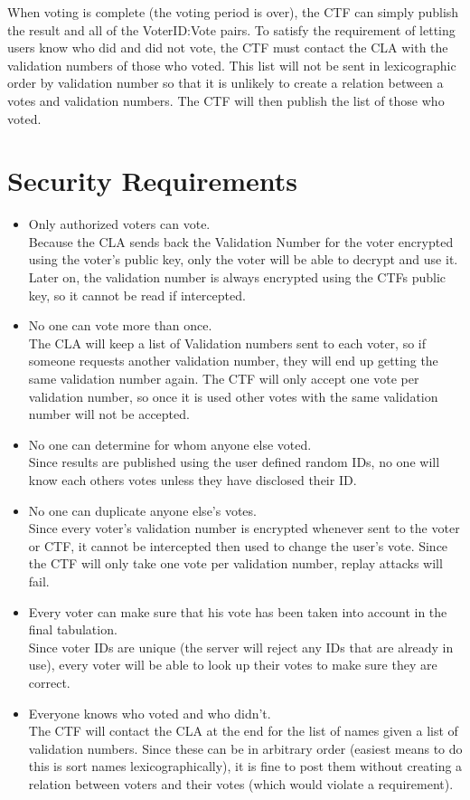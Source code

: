 \documentclass{article} \usepackage[margin=1in]{geometry} \usepackage{amsmath}
\begin{document}
When voting is complete (the voting period is over), the CTF can simply publish the result and all of the VoterID:Vote pairs. To satisfy the requirement of letting users know who did and did not vote, the CTF must contact the CLA with the validation numbers of those who voted. This list will not be sent in lexicographic order by validation number so that it is unlikely to create a relation between a votes and validation numbers. The CTF will then publish the list of those who voted. \\

\section{Security Requirements}

\begin{itemize}
  \item Only authorized voters can vote. \\
		Because the CLA sends back the Validation Number for the voter encrypted
		using the voter's public key, only the voter will be able to decrypt and
		use it. Later on, the validation number is always encrypted using the CTFs
		public key, so it cannot be read if intercepted.
	\item No one can vote more than once. \\
		The CLA will keep a list of Validation numbers sent to each voter, so if
		someone requests another validation number, they will end up getting the
		same validation number again. The CTF will only accept one vote per
		validation number, so once it is used other votes with the same validation
		number will not be accepted.
	\item No one can determine for whom anyone else voted. \\
		Since results are published using the user defined random IDs, no one will
		know each others votes unless they have disclosed their ID.
	\item No one can duplicate anyone else's votes. \\
		Since every voter's validation number is encrypted whenever sent to the
		voter or CTF, it cannot be intercepted then used to change the user's vote.
		Since the CTF will only take one vote per validation number, replay attacks
		will fail.	
	\item Every voter can make sure that his vote has been taken into account in the final tabulation. \\
		Since voter IDs are unique (the server will reject any IDs that are already
		in use), every voter will be able to look up their votes to make sure they
		are correct.
	\item Everyone knows who voted and who didn't. \\
		The CTF will contact the CLA at the end for the list of names given a list of validation numbers. Since these can be in arbitrary order (easiest means to do this is sort names lexicographically), it is fine to post them without creating a relation between voters and their votes (which would violate a requirement). 
\end{itemize}
\end{document}
